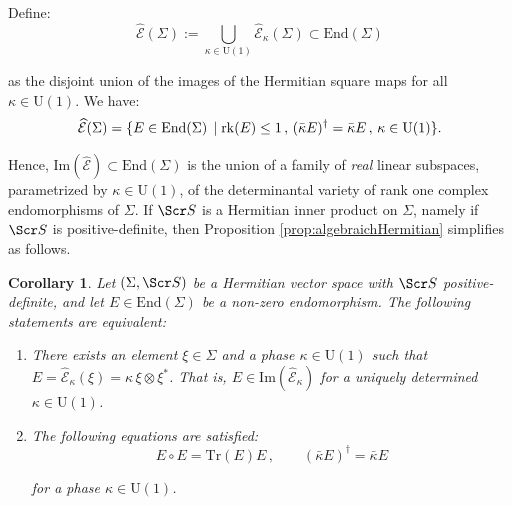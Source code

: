 \documentclass[10pt,a4paper,twoside,reqno]{amsart}
\theoremstyle{plain}
\newtheorem{cor}[thm]{Corollary}
\theoremstyle{definition}
\theoremstyle{remark}
\newcommand{\End}{\mathrm{End}}
\def\rk{{\rm rk}}
\newcommand{\Tr}{\mathrm{Tr}}
\def\scS{\Scr S}
\def\U{\mathrm{U}}
\def\hcE{\widehat{\mathcal{E}}}
\def\Im{\mathrm{Im}}
\begin{document}
\noindent
Define:
\begin{equation*}
\hcE(\Sigma) := \bigcup_{\kappa\in\U(1)}{\hcE}_\kappa(\Sigma) \subset \End(\Sigma)
\end{equation*}

\noindent
as the disjoint union of the images of the Hermitian square maps for all $\kappa\in\U(1)$. We have:
\begin{equation*}
\hcE (\Sigma) = \{E\in\End(\Sigma) \, \mid \rk(E) \leq 1\, , \,(\bar\kappa E)^\dagger= \bar\kappa E\, , \,  \kappa \in \U(1)\}.
\end{equation*}

\noindent
Hence, $\Im(\hcE)\subset \End(\Sigma)$ is the union of a family of \emph{real} linear subspaces, parametrized by $\kappa \in \U(1)$, of the determinantal variety of rank one complex endomorphisms of $\Sigma$. If $\scS$ is a Hermitian inner product on $\Sigma$, namely if $\scS$ is positive-definite, then Proposition \ref{prop:algebraichHermitian} simplifies as follows.

\begin{cor} 
Let $(\Sigma,\scS)$ be a Hermitian vector space with $\scS$ positive-definite, and let $E\in \End(\Sigma)$ be a non-zero endomorphism. The following statements are equivalent:   

\begin{enumerate}
\item[\normalfont(a)] There exists an element $\xi\in \Sigma$ and a phase $\kappa \in \U(1)$ such that $E = \hcE_{\kappa}(\xi) = \kappa\, \xi \otimes \xi^{\ast}$. That is, $E\in \Im (\hcE_{\kappa})$ for a uniquely determined $\kappa \in \U(1)$.

\item[\normalfont(b)]  The following equations are satisfied:
\begin{equation*}
E \circ  E=\Tr(E)E\, , \qquad (\bar\kappa E)^\dagger = \bar\kappa E
\end{equation*}

\noindent
for a phase $\kappa\in \U(1)$.
\end{enumerate}
\end{cor}
\end{document}
